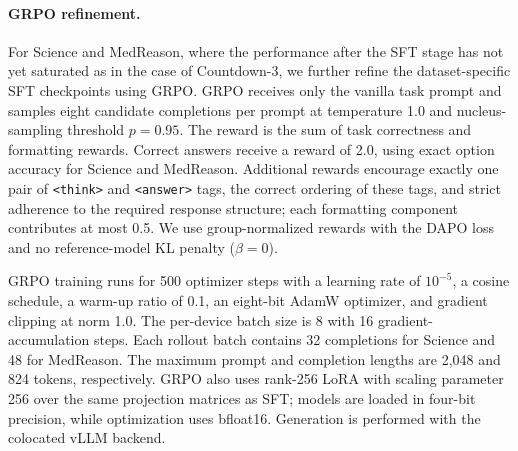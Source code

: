 \documentclass{article} %
\theoremstyle{plain}
\theoremstyle{definition}
\theoremstyle{remark}
\begin{document}
\paragraph{GRPO refinement.}
For Science and MedReason, where the performance after the SFT stage has not yet saturated as in the case of Countdown-3, we further refine the dataset-specific SFT checkpoints using GRPO. GRPO receives only the vanilla task prompt and samples eight candidate completions per prompt at temperature 1.0 and nucleus-sampling threshold \(p=0.95\). The reward is the sum of task correctness and formatting rewards. Correct answers receive a reward of 2.0, using exact option accuracy for Science and MedReason. Additional rewards encourage exactly one pair of \texttt{<think>} and \texttt{<answer>} tags, the correct ordering of these tags, and strict adherence to the required response structure; each formatting component contributes at most 0.5. We use group-normalized rewards with the DAPO loss and no reference-model KL penalty (\(\beta=0\)).

GRPO training runs for 500 optimizer steps with a learning rate of \(10^{-5}\), a cosine schedule, a warm-up ratio of 0.1, an eight-bit AdamW optimizer, and gradient clipping at norm 1.0. The per-device batch size is 8 with 16 gradient-accumulation steps. Each rollout batch contains 32 completions for Science and 48 for MedReason. The maximum prompt and completion lengths are 2,048 and 824 tokens, respectively. GRPO also uses rank-256 LoRA with scaling parameter 256 over the same projection matrices as SFT; models are loaded in four-bit precision, while optimization uses bfloat16. Generation is performed with the colocated vLLM backend.
\end{document}
